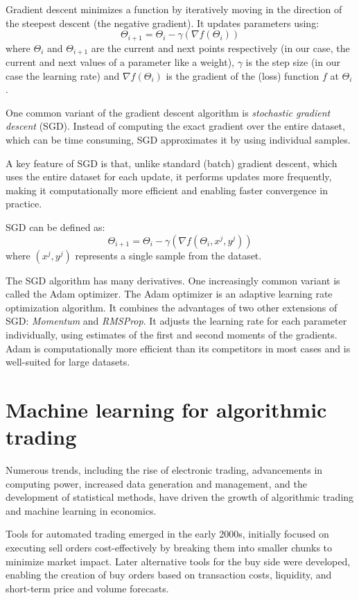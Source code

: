 \documentclass[a4paper,oneside,onecolumn,12pt]{book}
\begin{document}
		Gradient descent minimizes a function by iteratively moving in the direction of the steepest descent (the negative gradient). It updates parameters using:
		\[ \Theta_{i+1} = \Theta_{i} - \gamma(\nabla f(\Theta_i)) \]
		where $\Theta_{i}$ and $\Theta_{i+1}$ are the current and next points respectively (in our case, the current and next values of a parameter like a weight), $\gamma$ is the step size (in our case the learning rate) and $\nabla f(\Theta_i)$ is the gradient of the (loss) function $f$ at $\Theta_i$.

		One common variant of the gradient descent algorithm is \textit{stochastic gradient descent} (SGD). Instead of computing the exact gradient over the entire dataset, which can be time consuming, SGD approximates it by using individual samples. \cite{MML} 

		A key feature of SGD is that, unlike standard (batch) gradient descent, which uses the entire dataset for each update, it performs updates more frequently, making it computationally more efficient and enabling faster convergence in practice. \cite{COOTMLT}

		SGD can be defined as:
		\[ \Theta_{i+1} = \Theta_{i} - \gamma (\nabla f(\Theta_i, x^j, y^j)) \]
		where $(x^j, y^j)$ represents a single sample from the dataset. \cite{SGD} 

		The SGD algorithm has many derivatives. One increasingly common variant is called the Adam optimizer. The Adam optimizer is an adaptive learning rate optimization algorithm. It combines the advantages of two other extensions of SGD: \textit{Momentum} and \textit{RMSProp}. It adjusts the learning rate for each parameter individually, using estimates of the first and second moments of the gradients. Adam is computationally more efficient than its competitors in most cases and is well-suited for large datasets. \cite{AO} 

\section{Machine learning for algorithmic trading}
	Numerous trends, including the rise of electronic trading, advancements in computing power, increased data generation and management, and the development of statistical methods, have driven the growth of algorithmic trading and machine learning in economics.

	Tools for automated trading emerged in the early 2000s, initially focused on executing sell orders cost-effectively by breaking them into smaller chunks to minimize market impact. Later alternative tools for the buy side were developed, enabling the creation of buy orders based on transaction costs, liquidity, and short-term price and volume forecasts.
\end{document}
